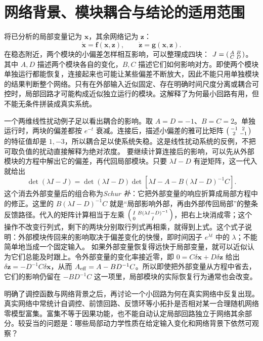 \section{网络背景、模块耦合与结论的适用范围}
将已分析的局部变量记为 $\bm x$，其余网络记为 $\bm z$：
\begin{equation}\dot{\bm x}=\bm f(\bm x,\bm z),\qquad\dot{\bm z}=\bm g(\bm x,\bm z).\end{equation}
在稳态附近，两个模块的小偏差怎样相互影响，可以整理成四块： $J=\begin{psmallmatrix}A&B\\C&D\end{psmallmatrix}$。其中 $A,D$ 描述两个模块各自的变化，$B,C$ 描述它们如何影响对方。即使两个模块单独运行都能恢复，连接起来也可能让某些偏差不断放大，因此不能只用单独模块的结果判断整个网络。只有在外部输入近似固定、存在明确时间尺度分离或耦合可控时，局部回路才可能构成近似独立运行的模块。这解释了为何最小回路有用，但不能无条件拼装成真实系统。

一个两维线性扰动例子足以看出耦合的影响。取 $A=D=-1$、$B=C=2$。单独运行时，两块的偏差都按 $e^{-t}$ 衰减。连接后，描述小偏差的雅可比矩阵
$\begin{psmallmatrix}-1&2\\2&-1\end{psmallmatrix}$ 的特征值却是 $1,-3$，所以耦合足以使系统失稳。这是线性扰动系统的反例，不把可取负值的扰动直接解释为绝对浓度。
要继续计算连接后的影响，可以先从外部模块的方程中解出它的偏差，再代回局部模块。只要 $\lambda I-D$ 有逆矩阵，这一代入就给出
\[
\det(\lambda I-J)=\det(\lambda I-D)
\det\left[\lambda I-A-B(\lambda I-D)^{-1}C\right].
\]
这个消去外部变量后的组合称为\emph{Schur 补}：它把外部变量的响应折算成局部方程中的修正。这里的 $B(\lambda I-D)^{-1}C$ 就是“局部影响外部，再由外部传回局部”的整条反馈路径。代入的矩阵计算相当于左乘 $\begin{psmallmatrix}I&B(\lambda I-D)^{-1}\\0&I\end{psmallmatrix}$，把右上块消成零；这个操作不改变行列式，剩下的两块分别取行列式再相乘，就得到上式。这个式子说明：外部模块传回来的影响取决于偏差变化的快慢，即时间因子 $e^{\lambda t}$ 中的 $\lambda$；不能简单地当成一个固定输入。
如果外部变量恢复得远快于局部变量，就可以近似认为它们总能及时跟上。令外部变量的变化率接近零，即 $0=C\delta\bm x+D\delta\bm z$ 给出 $\delta\bm z=-D^{-1}C\delta\bm x$，从而 $A_{\rm eff}=A-BD^{-1}C$。所以即使把外部变量从方程中省去，它们的影响仍留在 $-BD^{-1}C$ 这一项里，局部模块的实际恢复行为通常也会改变。


明确了调控函数与网络背景之后，再讨论一个小回路为何在真实网络中反复出现。
真实网络中常统计自调控、前馈回路、反馈环等小拓扑是否相对某一合理随机网络零模型富集。富集不等于因果功能，也不能自动认定局部回路独立于网络其余部分。较妥当的问题是：哪些局部动力学性质在给定输入变化和网络背景下依然可观察？

